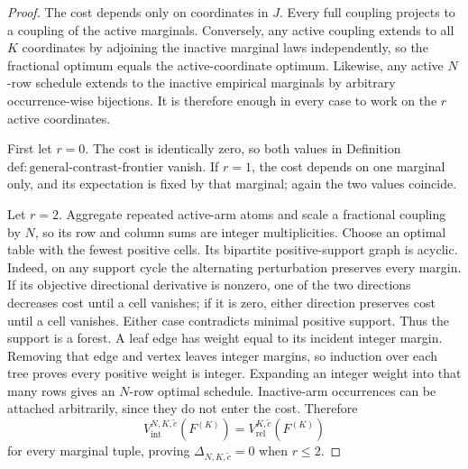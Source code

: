 \documentclass{article}
\begin{document}
\begin{proof}
The cost depends only on coordinates in \(J\).  Every full coupling projects to a coupling of the active marginals.  Conversely, any active coupling extends to all \(K\) coordinates by adjoining the inactive marginal laws independently, so the fractional optimum equals the active-coordinate optimum.  Likewise, any active \(N\)-row schedule extends to the inactive empirical marginals by arbitrary occurrence-wise bijections.  It is therefore enough in every case to work on the \(r\) active coordinates.

First let \(r=0\).  The cost is identically zero, so both values in Definition \(\mathrm{def{:}general\mbox{-}contrast\mbox{-}frontier}\) vanish.  If \(r=1\), the cost depends on one marginal only, and its expectation is fixed by that marginal; again the two values coincide.

Let \(r=2\).  Aggregate repeated active-arm atoms and scale a fractional coupling by \(N\), so its row and column sums are integer multiplicities.  Choose an optimal table with the fewest positive cells.  Its bipartite positive-support graph is acyclic.  Indeed, on any support cycle the alternating perturbation preserves every margin.  If its objective directional derivative is nonzero, one of the two directions decreases cost until a cell vanishes; if it is zero, either direction preserves cost until a cell vanishes.  Either case contradicts minimal positive support.  Thus the support is a forest.  A leaf edge has weight equal to its incident integer margin.  Removing that edge and vertex leaves integer margins, so induction over each tree proves every positive weight is integer.  Expanding an integer weight into that many rows gives an \(N\)-row optimal schedule.  Inactive-arm occurrences can be attached arbitrarily, since they do not enter the cost.  Therefore
\[
 V_{\mathrm{int}}^{N,K,\widetilde c}(F^{(K)})
 =V_{\mathrm{rel}}^{K,\widetilde c}(F^{(K)})
\]
for every marginal tuple, proving \(\Delta_{N,K,\widetilde c}=0\) when \(r\le2\).


\end{proof}
\end{document}
